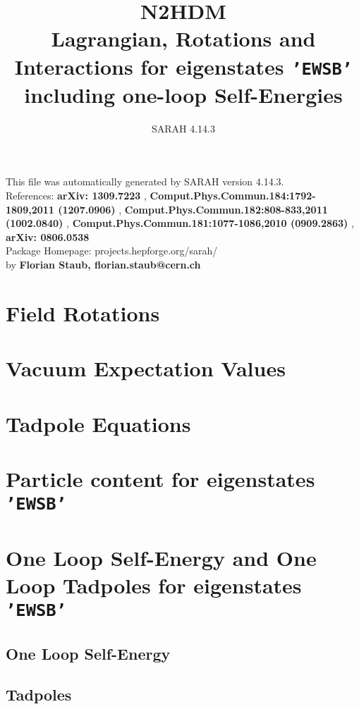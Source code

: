 \documentclass[A4]{article}
\begin{document}
\title{N2HDM\\ Lagrangian, Rotations and Interactions for eigenstates {\tt'EWSB'} \\ including one-loop Self-Energies \\ 
} 
\author{SARAH 4.14.3} 
 \maketitle 
 \vspace{10cm} 
This file was automatically generated by SARAH version 4.14.3.  \\ 
References: {\bf arXiv: 1309.7223 }, {\bf Comput.Phys.Commun.184:1792-1809,2011 (1207.0906) }, {\bf Comput.Phys.Commun.182:808-833,2011 (1002.0840) }, {\bf Comput.Phys.Commun.181:1077-1086,2010 (0909.2863) }, {\bf arXiv: 0806.0538 } \\ 
Package Homepage: projects.hepforge.org/sarah/ \\ 
by {\bf Florian Staub, florian.staub@cern.ch} 
 \pagebreak 
 \tableofcontents 
 \pagebreak 
 \allowdisplaybreaks 

\section{Field Rotations}
 
 
 
\section{Vacuum Expectation Values}
 
\section{Tadpole Equations}
 
\section{Particle content for eigenstates {\tt 'EWSB'}}
 
\section{One Loop Self-Energy and One Loop Tadpoles for eigenstates {\tt 'EWSB'}}
\subsection{One Loop Self-Energy}
 
\subsection{Tadpoles}
 
\end{document}
